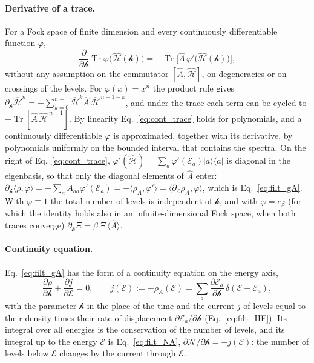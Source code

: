 \documentclass[10pt,a4paper]{article}
\theoremstyle{plain}
\newcommand{\Tr}{\operatorname{Tr}}
\newcommand{\cN}{\mathcal{N}}   %
\newcommand{\hfield}{\mathscr{h}}  %
\newcommand{\enrg}{\mathcal{E}}  %
\begin{document}
\paragraph{Derivative of a trace.} For a Fock space of finite dimension and
every continuously differentiable function $\varphi$,
\begin{equation}\label{eq:cont_trace}
  \frac{\partial}{\partial\hfield}\Tr\varphi\big(\hat{\mathcal H}(\hfield)\big)
  =-\Tr\big[\hat A\,\varphi'\big(\hat{\mathcal H}(\hfield)\big)\big] ,
\end{equation}
without any assumption on the commutator $[\hat A,\hat{\mathcal H}]$, on
degeneracies or on crossings of the levels. For $\varphi(x)=x^{n}$ the
product rule gives
$\partial_\hfield\hat{\mathcal H}^{n}=-\sum_{k=0}^{n-1}\hat{\mathcal H}^{k}\hat A\,\hat{\mathcal H}^{\,n-1-k}$,
and under the trace each term can be cycled to
$-\Tr[\hat A\,\hat{\mathcal H}^{\,n-1}]$. By linearity
Eq.~\eqref{eq:cont_trace} holds for polynomials, and a continuously
differentiable $\varphi$ is approximated, together with its derivative, by
polynomials uniformly on the bounded interval that contains the spectra. On
the right of Eq.~\eqref{eq:cont_trace},
$\varphi'(\hat{\mathcal H})=\sum_a\varphi'(\enrg_a)|a\rangle\langle a|$ is
diagonal in the eigenbasis, so that only the diagonal elements of $\hat A$
enter:
$\partial_\hfield\langle\rho,\varphi\rangle=-\sum_aA_{aa}\varphi'(\enrg_a)
=-\langle\rho_A,\varphi'\rangle=\langle\partial_\enrg\rho_A,\varphi\rangle$,
which is Eq.~\eqref{eq:filt_gA}. With $\varphi\equiv1$ the total number of
levels is independent of $\hfield$, and with $\varphi=e_\beta$ (for which the
identity holds also in an infinite-dimensional Fock space, when both traces
converge) $\partial_\hfield\Xi=\beta\,\Xi\,\langle\hat A\rangle$.

\paragraph{Continuity equation.} Eq.~\eqref{eq:filt_gA} has the form of a
continuity equation on the energy axis,
\[
  \frac{\partial\rho}{\partial\hfield}+\frac{\partial j}{\partial\enrg}=0 ,
  \qquad
  j(\enrg):=-\rho_A(\enrg)
  =\sum_a\frac{\partial\enrg_a}{\partial\hfield}\,\delta(\enrg-\enrg_a) ,
\]
with the parameter $\hfield$ in the place of the time and the current $j$ of
levels equal to their density times their rate of displacement
$\partial\enrg_a/\partial\hfield$ (Eq.~\eqref{eq:filt_HF}). Its integral over
all energies is the conservation of the number of levels, and its integral
up to the energy $\enrg$ is Eq.~\eqref{eq:filt_NA},
$\partial\cN/\partial\hfield=-j(\enrg)$: the number of levels below $\enrg$
changes by the current through $\enrg$.
\end{document}
